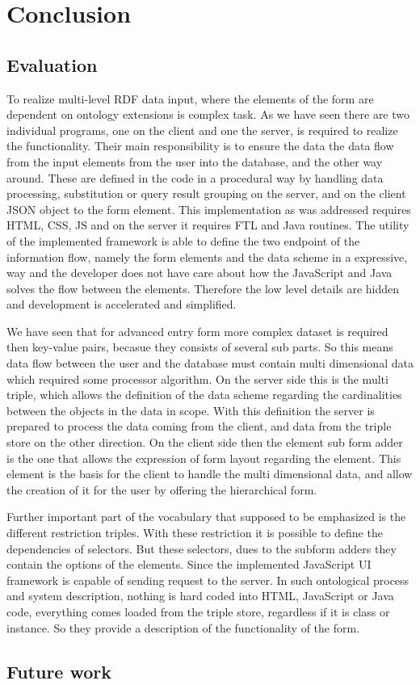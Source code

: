 

\chapter{Conclusion}

\section{Evaluation}


To realize multi-level RDF data input, where the elements of the form are dependent on ontology extensions is complex task. As we have seen there are two individual programs, one on the client and one the server, is required to realize the functionality. Their main responsibility is to ensure the data the data flow from the input elements from the user into the database, and the other way around. These are defined in the code in a procedural way by handling data processing, substitution or query result grouping on the server, and on the client JSON object to the form element. This implementation as was addressed requires HTML, CSS, JS and on the server it requires FTL and Java routines. The utility of the implemented framework is able to define the two endpoint of the information flow, namely the form elements and the data scheme in a expressive, way and the developer does not have care about how the JavaScript and Java solves the flow between the elements. Therefore the low level details are hidden and development is accelerated and simplified.


We have seen that for advanced entry form more complex dataset is required then key-value pairs, becasue they consists of several sub parts. So this means data flow between the user and the database must contain multi dimensional data which required some processor algorithm. On the server side this is the multi triple, which allows the definition of the data scheme regarding the cardinalities between the objects in the data in scope. With this definition the server is prepared to process the data coming from the client, and data from the triple store on the other direction. On the client side then the element sub form adder is the one that allows the expression of form layout regarding the element. This element is the basis for the client to handle the multi dimensional data, and allow the creation of it for the user by offering the hierarchical form.


Further important part of the vocabulary that supposed to be emphasized is the different restriction triples. With these restriction it is possible to define the dependencies of selectors. But these selectors, dues to the subform adders they contain the options of the elements. Since the implemented JavaScript UI framework is capable of sending request to the server. In such ontological process and system description, nothing is hard coded into HTML, JavaScript or Java code, everything comes loaded from the triple store, regardless if it is class or instance. So they provide a description of the functionality of the form. 


\section{Future work}


